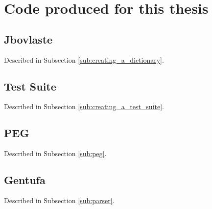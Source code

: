\chapter{Code produced for this thesis}

\section{Jbovlaste}
\label{appendix:jbovlaste-annex}

Described in Subsection \ref{sub:creating_a_dictionary}.



\newpage

\section{Test Suite}
\label{appendix:test_suite}

Described in Subsection \ref{sub:creating_a_test_suite}.



\newpage

\section{PEG}
\label{appendix:peg-annex}

Described in Subsection \ref{sub:peg}.



\newpage

\section{Gentufa}
\label{appendix:gentufa-annex}

Described in Subsection \ref{sub:parser}.


